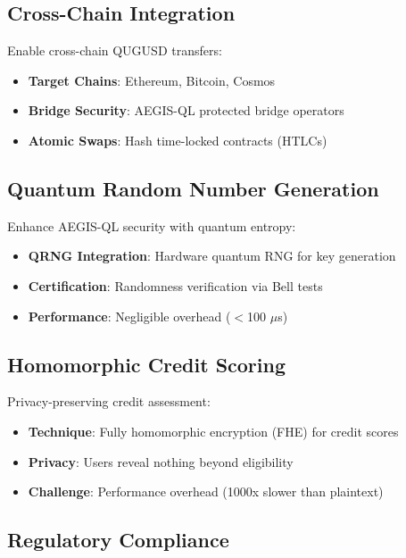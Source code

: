 \documentclass[11pt,a4paper]{article}
\begin{document}
\subsection{Cross-Chain Integration}

Enable cross-chain QUGUSD transfers:

\begin{itemize}[leftmargin=*]
    \item \textbf{Target Chains}: Ethereum, Bitcoin, Cosmos
    \item \textbf{Bridge Security}: AEGIS-QL protected bridge operators
    \item \textbf{Atomic Swaps}: Hash time-locked contracts (HTLCs)
\end{itemize}

\subsection{Quantum Random Number Generation}

Enhance AEGIS-QL security with quantum entropy:

\begin{itemize}[leftmargin=*]
    \item \textbf{QRNG Integration}: Hardware quantum RNG for key generation
    \item \textbf{Certification}: Randomness verification via Bell tests
    \item \textbf{Performance}: Negligible overhead ($<$100 $\mu$s)
\end{itemize}

\subsection{Homomorphic Credit Scoring}

Privacy-preserving credit assessment:

\begin{itemize}[leftmargin=*]
    \item \textbf{Technique}: Fully homomorphic encryption (FHE) for credit scores
    \item \textbf{Privacy}: Users reveal nothing beyond eligibility
    \item \textbf{Challenge}: Performance overhead (1000x slower than plaintext)
\end{itemize}

\subsection{Regulatory Compliance}
\end{document}
